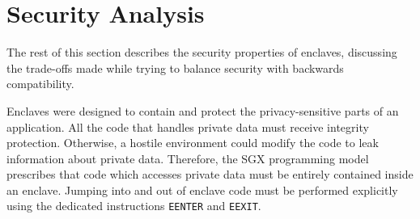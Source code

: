 \section{Security Analysis}
\label{sec:security}

The rest of this section describes the security properties of
enclaves, discussing the trade-offs made while trying to balance security with
backwards compatibility.



%
%







Enclaves were designed to contain and protect the privacy-sensitive parts of an
application. All the code that handles private data must receive integrity
protection. Otherwise, a hostile environment could modify the code to leak
information about private data. Therefore, the SGX programming model prescribes
that code which accesses private data must be entirely contained inside an
enclave. Jumping into and out of enclave code must be performed explicitly
using the dedicated instructions \texttt{EENTER} and \texttt{EEXIT}.



